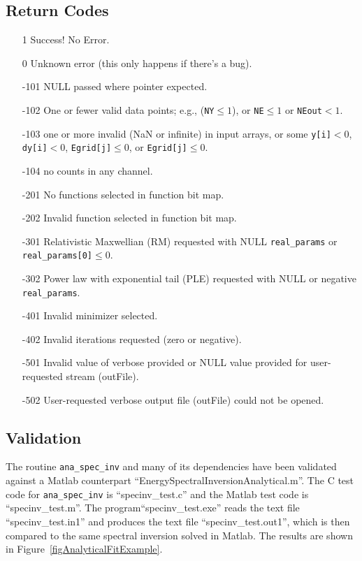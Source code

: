 \documentclass{article}    %
\begin{document}
\subsection{Return Codes}
\begin{itemize}
\item[1] Success! No Error.
\item[0] Unknown error (this only happens if there's a bug).
\item[-101] NULL passed where pointer expected.
\item[-102] One or fewer valid data points; e.g., (\verb|NY|$ \le 1$), or \verb|NE|$\le 1$ or \verb|NEout|$<1$.
\item[-103] one or more invalid (NaN or infinite) in input arrays, or 
  some \verb|y[i]|$<0$, \verb|dy[i]|$<0$, \verb|Egrid[j]|$\le 0$, or \verb|Egrid[j]|$\le 0$.
\item[-104] no counts in any channel.
\item[-201] No functions selected in function bit map.
\item[-202] Invalid function selected in function bit map.
\item[-301] Relativistic Maxwellian (RM) requested with NULL \verb|real_params| or \verb|real_params[0]|$ \le 0$.
\item[-302] Power law with exponential tail (PLE) requested with NULL or negative \verb|real_params|.
\item[-401] Invalid minimizer selected.
\item[-402] Invalid iterations requested (zero or negative).
\item[-501] Invalid value of verbose provided or NULL value provided for user-requested stream (outFile).
\item[-502] User-requested verbose output file (outFile) could not be opened.
\end{itemize}

\subsection{Validation}

The routine \verb|ana_spec_inv| and many of its dependencies have been
validated against a Matlab counterpart
``EnergySpectralInversionAnalytical.m''. The C test code for \verb|ana_spec_inv|
is ``specinv\_test.c'' and the Matlab test code is
``specinv\_test.m''.  The program``specinv\_test.exe'' reads the text file
``specinv\_test.in1'' and produces the text file
``specinv\_test.out1'', which is then compared to the same spectral
inversion solved in Matlab. The results are shown in
Figure~\ref{figAnalyticalFitExample}.
\end{document}
